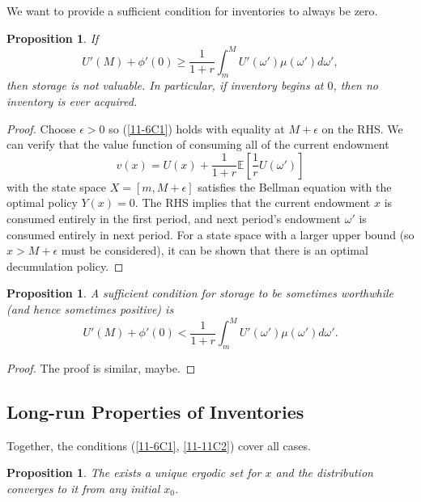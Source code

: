 \documentclass{tufte-handout}
\newcommand*\E{\mathbb{E}}
\newtheorem{prop}[thm]{Proposition}
\theoremstyle{definition}
\begin{document}
We want to provide a sufficient condition for inventories to always be zero.
\begin{prop}
	If  	\begin{equation}
		U'(M) + \phi'(0) \ge \frac{1}{1+r} \int_{m}^{M} U'(\omega')\mu(\omega')d\omega'  \label{11-6C1}
	,\end{equation}
	then storage is not valuable. In particular, if inventory begins at $0$, then no inventory is ever acquired.
\end{prop}

\begin{proof}
	Choose $\epsilon>0$ so (\ref{11-6C1}) holds with equality at $M+\epsilon$ on the RHS. We can verify that the value function of consuming all of the current endowment \[
		v(x) = U(x) + \frac{1}{1+r} \E\left[\frac{1}{r} U(\omega')\right] 
	\] with the state space $X = \left[ m,M+\epsilon \right]$ satisfies the Bellman equation with the optimal policy $Y(x) = 0$. The RHS implies that the current endowment $x$ is consumed entirely in the first period, and next period's endowment $\omega'$ is consumed entirely in next period. For a state space with a larger upper bound (so $x > M+\epsilon$ must be considered), it can be shown that there is an optimal decumulation policy.
\end{proof}

\begin{prop}
	A sufficient condition for storage to be sometimes worthwhile (and hence sometimes positive) is \begin{equation}  		U'(M) + \phi'(0) < \frac{1}{1+r} \int_{m}^{M} U'(\omega')\mu(\omega')d\omega' \label{11-11C2}
	.\end{equation}
\end{prop}

\begin{proof}
	The proof is similar, maybe.	
\end{proof}

\subsection{Long-run Properties of Inventories}

Together, the conditions (\ref{11-6C1}, \ref{11-11C2}) cover all cases.

\begin{prop}
	The exists a unique ergodic set for $x$ and the distribution converges to it from any initial $x_0$.
\end{prop}
\end{document}
